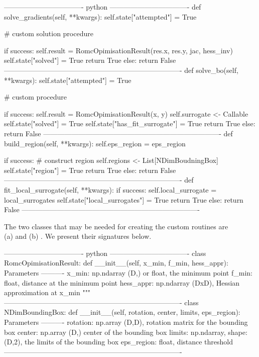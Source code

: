 \begin{Code}
---------------------------------- python ----------------------------------
def solve_gradients(self, **kwargs):
  self.state["attempted"] = True

  # custom solution procedure
  
  if success:
    self.result = RomcOpimisationResult(res.x, res.y, jac, hess_inv)
    self.state["solved"] = True
    return True 
  else:
    return False 
----------------------------------------------------------------------------    
def solve_bo(self, **kwargs):
  self.state["attempted"] = True

  # custom procedure

  if success:
    self.result = RomcOpimisationResult(x, y)
    self.surrogate <- Callable
    self.state["solved"] = True
    self.state["has_fit_surrogate"] = True
    return True
  else:
    return False
----------------------------------------------------------------------------    
def build_region(self, **kwargs):
    self.eps_region = eps_region

    if success:
        # construct region
        self.regions <- List[NDimBoudningBox]
        self.state["region"] = True
        return True
    else:
        return False
----------------------------------------------------------------------------    
def fit_local_surrogate(self, **kwargs):
  if success:
    self.local_surrogate = local_surrogates
    self.state["local_surrogates"] = True
    return True
  else:
    return False
----------------------------------------------------------------------------    
\end{Code}

The two classes that may be needed for creating the custom routines
are \\ (a)  and (b)
. We present their signatures below.

\begin{Code}
---------------------------------- python ----------------------------------
class RomcOpimisationResult:
    def __init__(self, x_min, f_min, hess_appr):
        Parameters
        ----------
        x_min: np.ndarray (D,) or float, the minimum point
        f_min: float, distance at the minimum point
        hess_appr: np.ndarray (DxD), Hessian approximation at x_min
        """
----------------------------------------------------------------------------    
class NDimBoundingBox:
    def __init__(self, rotation, center, limits, eps_region):
        Parameters
        ----------
        rotation: np.array (D,D),  rotation matrix for the bounding box
        center: np.array (D,) center of the bounding box
        limits: np.ndarray, shape: (D,2), the limits of the bounding box
        eps_region: float, distance threshold 
----------------------------------------------------------------------------    
\end{Code}

